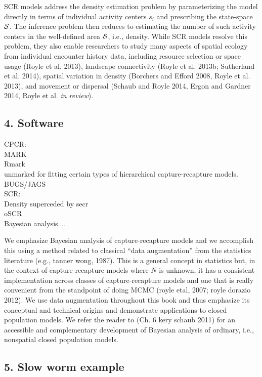 \documentclass{book}
\begin{document}
SCR models address the density estimation problem by parameterizing
the model directly in terms of individual activity centers $s_i$ and
prescribing the state-space ${\cal S}$. The inference problem then
reduces to estimating the number of such activity centers in the
well-defined area ${\cal S}$, i.e., density. While SCR models resolve
this problem, they also enable researchers to study many aspects of
spatial ecology from individual encounter history data, including
resource selection or space usage (Royle et al. 2013), landscape
connectivity (Royle et al. 2013b; Sutherland et al. 2014), spatial
variation in density (Borchers and Efford 2008, Royle et al. 2013),
and movement or dispersal (Schaub and Royle 2014, Ergon and Gardner
2014, Royle et al. {\it in review}). 

\subsection*{4. Software}

CPCR:\\
  MARK\\
  Rmark\\
  unmarked for fitting certain types of hierarchical capture-recapture models.\\
  BUGS/JAGS\\
SCR:\\
  Density superceded by secr\\
  oSCR\\

Bayesian analysis....

We emphasize Bayesian analysis of capture-recapture models and we
accomplish this using a method related to classical ``data
augmentation'' from the statistics literature (e.g., tanner wong, 1987).  This is a general concept in
statistics but, in the context of capture-recapture models where $N$
is unknown, it has a consistent implementation across classes of
capture-recapture models and one that is really convenient from the
standpoint of doing MCMC
(royle etal, 2007; royle dorazio 2012). We use data augmentation
throughout this book and thus emphasize its conceptual and technical
origins and demonstrate applications to closed population models.  We
refer the reader to (Ch. 6 kery schaub 2011) for an
accessible and complementary development of Bayesian analysis of
ordinary, i.e., nonspatial closed population models.



\subsection*{5. Slow worm example}
\end{document}
